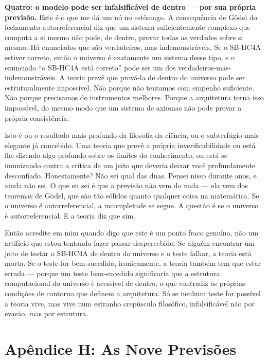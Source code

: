 \documentclass[11pt, twoside, openright]{book}
\begin{document}
\textbf{Quatro: o modelo pode ser infalsificável de dentro --- por sua própria previsão.} Este é o que me dá um nó no estômago. A consequência de Gödel do fechamento autorreferencial diz que um sistema suficientemente complexo que computa a si mesmo não pode, de dentro, provar todas as verdades sobre si mesmo. Há enunciados que são verdadeiros, mas indemonstráveis. Se o SB-HC4A estiver correto, então o universo é exatamente um sistema desse tipo, e o enunciado ``o SB-HC4A está correto'' pode ser um dos verdadeiros-mas-indemonstráveis. A teoria prevê que prová-la de dentro do universo pode ser estruturalmente impossível. Não porque não tentamos com empenho suficiente. Não porque precisamos de instrumentos melhores. Porque a arquitetura torna isso impossível, do mesmo modo que um sistema de axiomas não pode provar a própria consistência.

Isto é ou o resultado mais profundo da filosofia da ciência, ou o subterfúgio mais elegante já concebido. Uma teoria que prevê a própria inverificabilidade ou está lhe dizendo algo profundo sobre os limites do conhecimento, ou está se imunizando contra a crítica de um jeito que deveria deixar você profundamente desconfiado. Honestamente? Não sei qual das duas. Pensei nisso durante anos, e ainda não sei. O que eu sei é que a previsão não vem do nada --- ela vem dos teoremas de Gödel, que são tão sólidos quanto qualquer coisa na matemática. Se o universo é autorreferencial, a incompletude se segue. A questão é se o universo é autorreferencial. E a teoria diz que sim.

Então acredite em mim quando digo que este é um ponto fraco genuíno, não um artifício que estou tentando fazer passar despercebido. Se alguém encontrar um jeito de testar o SB-HC4A de dentro do universo e o teste falhar, a teoria está morta. Se o teste for bem-sucedido, ironicamente, a teoria também tem que estar errada --- porque um teste bem-sucedido significaria que a estrutura computacional do universo é acessível de dentro, o que contradiz as próprias condições de contorno que definem a arquitetura. Só se nenhum teste for possível a teoria vive, mas vive num estranho crepúsculo filosófico, infalsificável não por evasão, mas por estrutura.


\chapter*{Apêndice H: As Nove Previsões}
\end{document}
